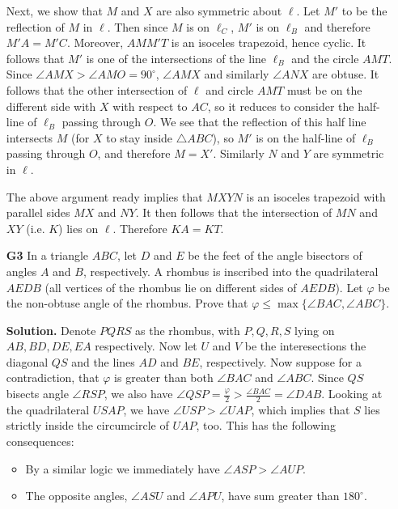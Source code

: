 \documentclass[11pt,a4paper]{article}
\begin{document}
\begin{enumerate}
	Next, we show that $M$ and $X$ are also symmetric about $\ell$. Let $M'$ to be the reflection of $M$ in $\ell$. Then since $M$ is on $\ell_C$, $M'$ is on $\ell_B$ and therefore $M'A=M'C$. Moreover, $AMM'T$ is an isoceles trapezoid, hence cyclic. It follows that $M'$ is one of the intersections of the line $\ell_B$ and the circle $AMT$. Since $\angle AMX>\angle AMO=90^{\circ}$, $\angle AMX$ and similarly $\angle ANX$ are obtuse. It follows that the other intersection of $\ell$ and circle $AMT$ must be on the different side with $X$ with respect to $AC$, so it reduces to consider the half-line of $\ell_B$ passing through $O$. We see that the reflection of this half line intersects $M$ (for $X$ to stay inside $\triangle ABC$), so $M'$ is on the half-line of $\ell_B$ passing through $O$, and therefore $M=X'$. Similarly $N$ and $Y$ are symmetric in $\ell$. 
	
	The above argument ready implies that $MXYN$ is an isoceles trapezoid with parallel sides $MX$ and $NY$. It then follows that the intersection of $MN$ and $XY$ (i.e. $K$) lies on $\ell$. Therefore $KA=KT$. 
	
	\item[\textbf{G3}] In a triangle $ABC$, let $D$ and $E$ be the feet of the angle bisectors of angles $A$ and $B$, respectively. A rhombus is inscribed into the quadrilateral $AEDB$ (all vertices of the rhombus lie on different sides of $AEDB$). Let $\varphi$ be the non-obtuse angle of the rhombus. Prove that $\varphi \le \max \{  \angle BAC, \angle ABC  \}$.
	
	\textbf{Solution.} Denote $PQRS$ as the rhombus, with $P, Q, R, S$ lying on $AB, BD, DE, EA$ respectively. 
	Now let $U$ and $V$ be the interesections the diagonal $QS$ and the lines $AD$ and $BE$, respectively. 
	Now suppose for a contradiction, that $\varphi $ is greater than both $\angle BAC$ and $\angle ABC$. 
	Since $QS$ bisects angle $\angle RSP$, we also have $\angle QSP=\frac{\varphi}{2}>\frac{\angle BAC}{2}=\angle DAB$. Looking at the quadrilateral $USAP$, we have $\angle USP>\angle UAP$, which implies that $S$ lies strictly inside the circumcircle of $UAP$, too. This has the following consequences: 
	\begin{itemize}
		\item By a similar logic we immediately have $\angle ASP > \angle AUP$. 
		
		\item The opposite angles, $\angle ASU$ and $\angle APU$, have sum greater than $180^{\circ}$. 
		

\end{itemize}
\end{enumerate}
\end{document}
